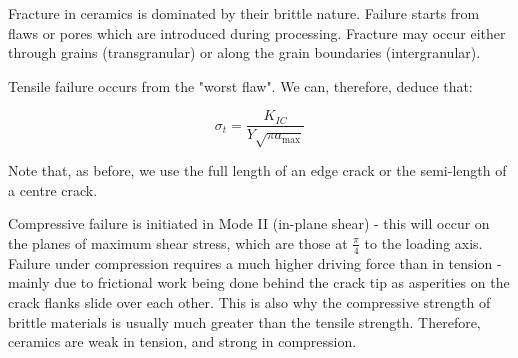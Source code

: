 \documentclass{article}
\begin{document}
\begin{proposition}
    Fracture in ceramics is dominated by their brittle nature. Failure starts from flaws or pores which are introduced during processing. Fracture may occur either through grains (transgranular) or along the grain boundaries (intergranular).

    Tensile failure occurs from the "worst flaw". We can, therefore, deduce that:

    \[ \sigma_t = \frac{K_{IC}}{Y\sqrt{\pi a_{\text{max}}}} \]

    Note that, as before, we use the full length of an edge crack or the semi-length of a centre crack.

    Compressive failure is initiated in Mode II (in-plane shear) - this will occur on the planes of maximum shear stress, which are those at $\frac{\pi}{4}$ to the loading axis. Failure under compression requires a much higher driving force than in tension - mainly due to frictional work being done behind the crack tip as asperities on the crack flanks slide over each other. This is also why the compressive strength of brittle materials is usually much greater than the tensile strength. Therefore, ceramics are weak in tension, and strong in compression.
\end{proposition}
\end{document}
